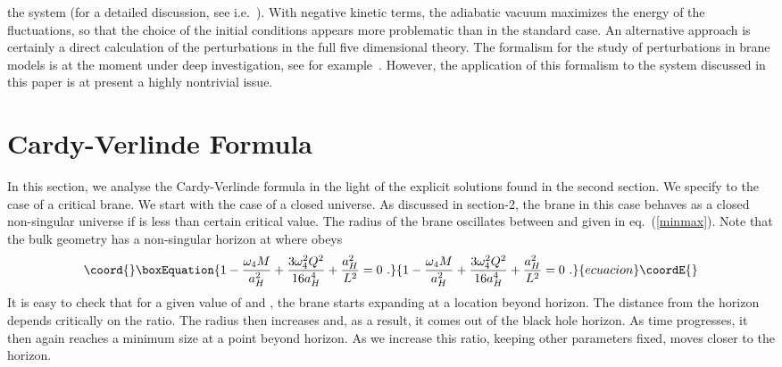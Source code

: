 \documentclass[a4paper,11pt]{article}
\begin{document}
the system (for a detailed discussion, see i.e.~\cite{MABR}). With
negative kinetic terms, the adiabatic vacuum maximizes the energy of the
fluctuations, so that the choice of the initial conditions appears more
problematic than in the standard case. An alternative approach is
certainly a direct calculation of the perturbations in the full five
dimensional theory. The formalism for the study of perturbations in brane
models is at the moment under deep investigation, see for
example~\cite{P1,P2,P3}. However, the application of this formalism to the
system discussed in this paper is at present a highly nontrivial issue.








\section{Cardy-Verlinde Formula\label{CVF}}

In this section, we analyse the Cardy-Verlinde formula  \cite{EV,SV} in 
the light of the explicit solutions found in the second section. We
specify to the case of a critical brane. We start with the case of a
closed universe. As discussed in section-2, the brane in this case 
behaves as a closed non-singular universe if \coordHE{} is less than certain 
critical value. The radius of the brane oscillates between  \coordHE{}
and \coordHE{} given in eq.~(\ref{minmax}). Note that the bulk geometry
has a  non-singular horizon at \coordHE{} where \coordHE{} obeys
%
\begin{equation}\coord{}\boxEquation{
1 - {\omega_{4} M\over{a_H^{2}}} + {3 \omega_{4}^2 Q^2
\over {16 a_H^{4}}} + {a_H^2\over{L^2}} =0 \,\,.
\label{horiloc}
}{
1 - {\omega_{4} M\over{a_H^{2}}} + {3 \omega_{4}^2 Q^2
\over {16 a_H^{4}}} + {a_H^2\over{L^2}} =0 \,\,.
}{ecuacion}\coordE{}\end{equation}
%
It is easy to check that for a given 
value of \coordHE{} and \coordHE{}, the brane starts expanding at a location beyond
horizon. The distance from the horizon depends critically on the 
\coordHE{} ratio. The radius then increases and, as a result, it comes out 
of the black hole horizon. As time progresses, it then again reaches a 
minimum size 
at a point beyond horizon. 
As we increase this ratio, keeping other 
parameters fixed, \coordHE{} moves closer to the horizon.
\end{document}
